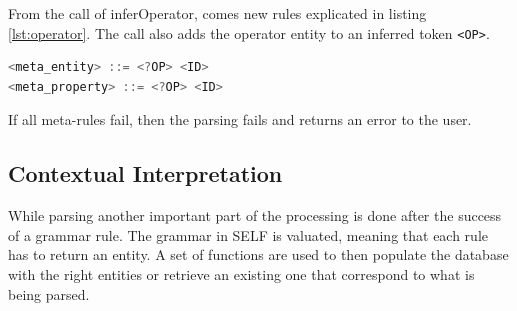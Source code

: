 \documentclass[11pt,a4paper,twoside,openright,titlepage,numbers=noenddot,headinclude,cleardoublepage=empty,openany]{scrreprt}
\theoremstyle{plain}
\theoremstyle{definition}
\theoremstyle{remark}
\newcommand{\algorithmicbreak}{\textbf{break}}
\newcommand{\Break}{\State \algorithmicbreak}\newcommand{\algorithmiccontinue}{\textbf{continue}}
\newcommand{\passthrough}[1]{#1}
\begin{document}

From the call of inferOperator, comes new rules explicated in
listing \ref{lst:operator}. The call also adds the operator entity to an
inferred token \passthrough{\lstinline!<OP>!}.

\begin{lstlisting}[language=Java, caption={Rules added to the current grammar for handling operators}, escapechar={$}, label=lst:operator]
<meta_entity> ::= <?OP> <ID>
<meta_property> ::= <?OP> <ID>
\end{lstlisting}

If all meta-rules fail, then the parsing fails and returns an error to
the user.

\hypertarget{contextual-interpretation}{%
\subsection{Contextual Interpretation}\label{contextual-interpretation}}

While parsing another important part of the processing is done after the
success of a grammar rule. The grammar in SELF is valuated, meaning that
each rule has to return an entity. A set of functions are used to then
populate the database with the right entities or retrieve an existing
one that correspond to what is being parsed.
\end{document}
